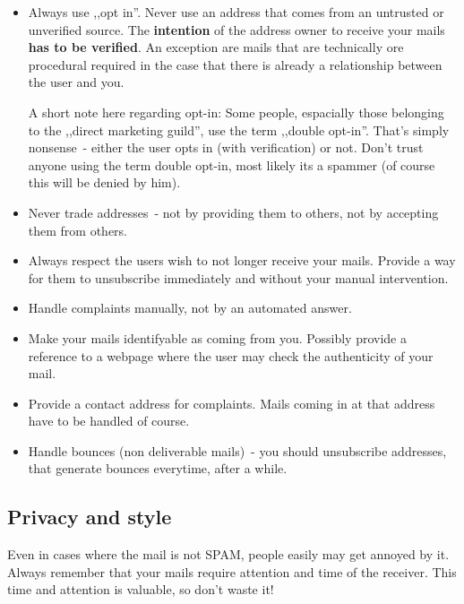 \documentclass{article}
\begin{document}
\begin{itemize}
  \item Always use ,,opt in''. Never use an address that comes from an
        untrusted or unverified source. The \textbf{intention} of the
	address owner to receive your mails \textbf{has to be verified}.
	An exception
	are mails that are technically ore procedural required in the
	case that there is already a relationship between the user and
	you.

	A short note here regarding opt-in: Some people, espacially those
	belonging to the ,,direct marketing guild'', use the term ,,double
	opt-in''. That's simply nonsense~- either the user opts in (with
	verification) or not. Don't trust anyone using the term double
	opt-in, most likely its a spammer (of course this will be denied
	by him).
  \item Never trade addresses~- not by providing them to others, not by
	accepting them from others.
  \item Always respect the users wish to not longer receive your mails.
        Provide a way for them to unsubscribe immediately and without
	your manual intervention.
  \item Handle complaints manually, not by an automated answer.
  \item Make your mails identifyable as coming from you. Possibly
        provide a reference to a webpage where the user may check the
	authenticity of your mail.
  \item Provide a contact address for complaints. Mails coming in at
        that address have to be handled of course.
  \item Handle bounces (non deliverable mails)~- you should unsubscribe
        addresses, that generate bounces everytime, after a while.
\end{itemize}

\subsection{Privacy and style}

Even in cases where the mail is not SPAM, people easily may get annoyed by it.
Always remember that your mails require attention and time of the receiver.
This time and attention is valuable, so don't waste it!
\end{document}
